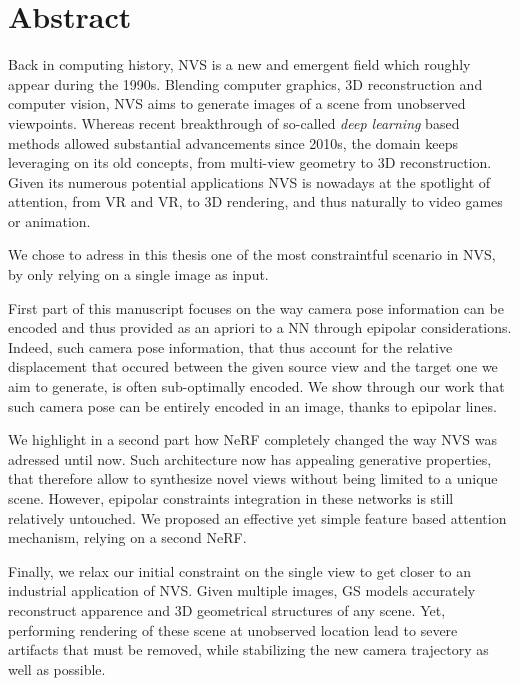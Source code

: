 \cleardoublepage
\setcounter{page}{1}

\chapter{Abstract}
Back in computing history, \ac{NVS} is a new and emergent field which roughly appear during the 1990s. Blending computer graphics, 3D reconstruction and computer vision, \ac{NVS} aims to generate images of a scene from unobserved viewpoints. Whereas recent breakthrough of so-called \textit{deep learning} based methods allowed substantial advancements since 2010s, the domain keeps leveraging on its old concepts, from multi-view geometry to 3D reconstruction. Given its numerous potential applications \ac{NVS} is nowadays at the spotlight of attention, from \ac{VR} and \ac{VR}, to 3D rendering, and thus naturally to video games or animation.

We chose to adress in this thesis one of the most constraintful scenario in \ac{NVS}, by only relying on a single image as input. 

First part of this manuscript focuses on the way camera pose information can be encoded and thus provided as an apriori to a \ac{NN} through epipolar considerations. Indeed, such camera pose information, that thus account for the relative displacement that occured between the given source view and the target one we aim to generate, is often sub-optimally encoded. We show through our work that such camera pose can be entirely encoded in an image, thanks to epipolar lines. 

We highlight in a second part how \ac{NeRF} completely changed the way \ac{NVS} was adressed until now. Such architecture now has appealing generative properties, that therefore allow to synthesize novel views without being limited to a unique scene. However, epipolar constraints integration in these networks is still relatively untouched. We proposed an effective yet simple feature based attention mechanism, relying on a second \ac{NeRF}. 

Finally, we relax our initial constraint on the single view to get closer to an industrial application of \ac{NVS}. Given multiple images, \ac{GS} models accurately reconstruct apparence and 3D geometrical structures of any scene. Yet, performing rendering of these scene at unobserved location lead to severe artifacts that must be removed, while stabilizing the new camera trajectory as well as possible. 

\cleardoublepage


